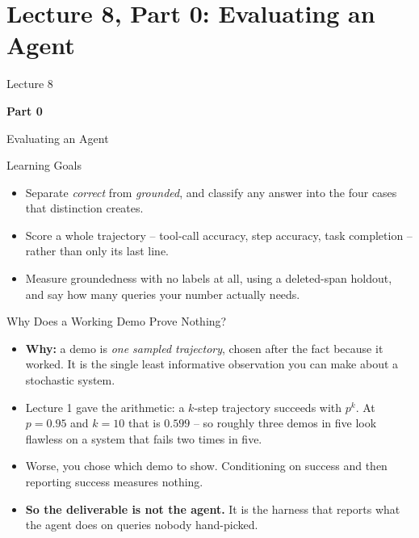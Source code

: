 \section{Lecture 8, Part 0: Evaluating an Agent}

\begin{frame}
\vfill
\centering
{\color{RLBlue}\large Lecture 8}

\vspace{0.3em}
{\color{RLBlue}\Large\bfseries Part 0}

\vspace{0.6em}
{\Large Evaluating an Agent}
\vfill
\end{frame}

\begin{frame}{Learning Goals}
\begin{itemize}
  \item Separate \emph{correct} from \emph{grounded}, and classify any answer into the four cases that distinction creates.
  \pause
  \item Score a whole trajectory -- tool-call accuracy, step accuracy, task completion -- rather than only its last line.
  \pause
  \item Measure groundedness with no labels at all, using a deleted-span holdout, and say how many queries your number actually needs.
\end{itemize}
\end{frame}

\begin{frame}{Why Does a Working Demo Prove Nothing?}
\begin{itemize}
  \item \textbf{Why:} a demo is \emph{one sampled trajectory}, chosen after the fact because it worked. It is the single least informative observation you can make about a stochastic system.
  \pause
  \item Lecture 1 gave the arithmetic: a $k$-step trajectory succeeds with $p^{k}$. At $p = 0.95$ and $k = 10$ that is $0.599$ -- so roughly three demos in five look flawless on a system that fails two times in five.
  \pause
  \item Worse, you chose which demo to show. Conditioning on success and then reporting success measures nothing.
  \pause
  \item \textbf{So the deliverable is not the agent.} It is the harness that reports what the agent does on queries nobody hand-picked.
\end{itemize}
\end{frame}

